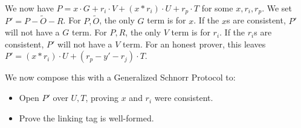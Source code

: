 \documentclass[]{article}
\begin{document}
We now have $P = x \cdot G + r_i \cdot V + (x * r_i) \cdot U + r_p \cdot T$ for some $x, r_i, r_p$. We set $P' = P - \tilde{O} - R$. For $P, \tilde{O}$, the only $G$ term is for $x$. If the $x$s are consistent, $P'$ will not have a $G$ term. For $P, R$, the only $V$ term is for $r_i$. If the $r_i$s are consistent, $P'$ will not have a $V$ term. For an honest prover, this leaves $P' = (x * r_i) \cdot U + (r_p - y' - r_j) \cdot T$.

We now compose this with a Generalized Schnorr Protocol to:
\begin{itemize}
	\item Open $P'$ over $U, T$, proving $x$ and $r_i$ were consistent.
	\item Prove the linking tag is well-formed.
\end{itemize}
\end{document}
